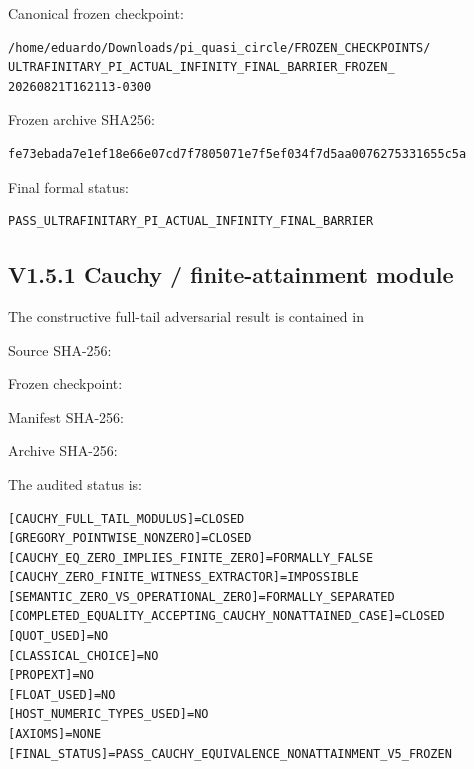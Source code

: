 \documentclass[11pt,a4paper]{article}
\begin{document}
Canonical frozen checkpoint:
\begin{verbatim}
/home/eduardo/Downloads/pi_quasi_circle/FROZEN_CHECKPOINTS/
ULTRAFINITARY_PI_ACTUAL_INFINITY_FINAL_BARRIER_FROZEN_
20260821T162113-0300
\end{verbatim}

Frozen archive SHA256:
\begin{verbatim}
fe73ebada7e1ef18e66e07cd7f7805071e7f5ef034f7d5aa0076275331655c5a
\end{verbatim}

Final formal status:
\begin{verbatim}
PASS_ULTRAFINITARY_PI_ACTUAL_INFINITY_FINAL_BARRIER
\end{verbatim}


\subsection*{V1.5.1 Cauchy / finite-attainment module}

The constructive full-tail adversarial result is contained in
\begin{center}
\end{center}

Source SHA-256:
\begin{center}
\end{center}

Frozen checkpoint:
\begin{center}
\end{center}

Manifest SHA-256:
\begin{center}
\end{center}

Archive SHA-256:
\begin{center}
\end{center}

The audited status is:
\begin{verbatim}
[CAUCHY_FULL_TAIL_MODULUS]=CLOSED
[GREGORY_POINTWISE_NONZERO]=CLOSED
[CAUCHY_EQ_ZERO_IMPLIES_FINITE_ZERO]=FORMALLY_FALSE
[CAUCHY_ZERO_FINITE_WITNESS_EXTRACTOR]=IMPOSSIBLE
[SEMANTIC_ZERO_VS_OPERATIONAL_ZERO]=FORMALLY_SEPARATED
[COMPLETED_EQUALITY_ACCEPTING_CAUCHY_NONATTAINED_CASE]=CLOSED
[QUOT_USED]=NO
[CLASSICAL_CHOICE]=NO
[PROPEXT]=NO
[FLOAT_USED]=NO
[HOST_NUMERIC_TYPES_USED]=NO
[AXIOMS]=NONE
[FINAL_STATUS]=PASS_CAUCHY_EQUIVALENCE_NONATTAINMENT_V5_FROZEN
\end{verbatim}
\end{document}
